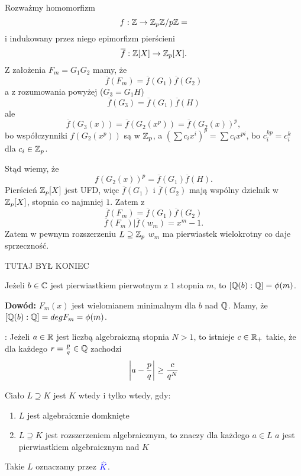 Rozważmy homomorfizm
$$f:\Z\to\Z_p\Z/p\Z=$$
i indukowany przez niego epimorfizm pierścieni
$$\overline f:\Z[X]\to\Z_p[X].$$
Z założenia $F_m=G_1G_2$ mamy, że
$$\overline f(F_m)=\overline f(G_1)\overline f(G_2)$$
a z rozumowania powyżej ($G_3=G_1H$)
$$\overline f(G_3)=\overline f(G_1)\overline f(H)$$
ale
$$\overline f(G_3(x))=\overline f(G_2(x^p))=\overline f(G_2(x))^p,$$
bo współczynniki $f(G_2(x^p))$ są w $\Z_p$, a $(\sum c_ix^i)^p=\sum c_ix^{pi}$, bo $c_i^{kp}=c_i^k$ dla $c_i\in\Z_p$.

Stąd wiemy, że
$$f(G_2(x))^p=\overline f(G_1)\overline f(H).$$
Pierścień $\Z_p[X]$ jest UFD, więc $\overline f(G_1)$ i $\overline f(G_2)$ mają wspólny dzielnik w $\Z_p[X]$, stopnia co najmniej $1$. Zatem z
$$\overline f(F_m)=\overline f(G_1)\overline f(G_2)$$
$$\overline f(F_m)|\overline f(w_m)=x^m-1.$$
Zatem w pewnym rozszerzeniu $L\supseteq\Z_p$ $w_m$ ma pierwiastek wielokrotny co daje sprzeczność.

{\large\color{orange}TUTAJ BYŁ KONIEC}

\begin{wniosek}
    Jeżeli $b\in\C$ jest pierwiastkiem pierwotnym z $1$ stopnia $m$, to $[\Q(b):\Q]=\phi(m)$.
\end{wniosek}

\textbf{Dowód:} $F_m(x)$ jest wielomianem minimalnym dla $b$ nad $\Q$. Mamy, że $[\Q(b):\Q]=deg F_m=\phi(m)$.

\begin{lemat} : Jeżeli $a\in\R$ jest liczbą algebraiczną stopnia $N>1$, to istnieje $c\in\R_+$ takie, że dla każdego $r=\frac pq\in\Q$ zachodzi
    $$\left|a-\frac pq\right|\geq{c\over q^N}$$
\end{lemat}

\begin{definicja}
    Ciało $L\supseteq K$ jest  $K$ wtedy i tylko wtedy, gdy:
    \begin{enumerate}
        \item $L$ jest algebraicznie domknięte
        \item $L\supseteq K$ jest rozszerzeniem algebraicznym, to znaczy dla każdego $a\in L$ $a$ jest pierwiastkiem algebraicznym nad $K$
    \end{enumerate}
    Takie $L$ oznaczamy przez $\color{blue}\hat{K}$.
\end{definicja}

